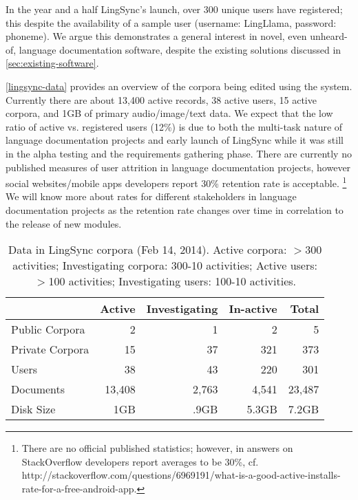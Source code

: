 \documentclass[11pt]{article}
\begin{document}
In the year and a half LingSync's launch, over 300 unique users have
registered; this despite the availability of a sample user (username:
LingLlama, password: phoneme). We argue this demonstrates a general interest in
novel, even unheard-of, language documentation software, despite the existing
solutions discussed in \autoref{sec:existing-software}.

\autoref{lingsync-data} provides an overview of the corpora being edited using
the system. Currently there are about 13,400 active records, 38 active users,
15 active corpora, and 1GB of primary audio/image/text data. We expect that the
low ratio of active vs. registered users (12\%) is due to both the multi-task
nature of language documentation projects and early launch of LingSync while it
was still in the alpha testing and the requirements gathering phase.  There are currently no published measures of user
attrition in language documentation projects, however social websites/mobile
apps  developers report 30\% retention rate is acceptable.%
\footnote{There are no official published statistics; however, in answers on
    StackOverflow developers report averages to be 30\%, cf.
http://stackoverflow.com/questions/6969191/what-is-a-good-active-installs-rate-for-a-free-android-app.}
We will
know more about rates for different stakeholders in language documentation projects as the retention rate changes over time  in correlation to the
release of new modules.

\begin{table}[h]
\begin{center}
\scriptsize
\begin{tabular}{lrrrr}
      \toprule
                     ~ &  Active & Investigating & In-active & Total\\
      \midrule
      Public Corpora  &       2 &   1 &   2 & 5 \\ 
      Private Corpora &      15 &  37 & 321 & 373\\ 
      Users           &      38 &  43 & 220 & 301 \\
      Documents & 13,408 & 2,763 & 4,541 &23,487\\
      Disk Size & 1GB & .9GB & 5.3GB& 7.2GB\\
      
      \bottomrule

\end{tabular}
\caption{Data in LingSync corpora (Feb 14, 2014). Active corpora: $>$300
activities; Investigating corpora: 300-10 activities; Active users: $>$100
activities; Investigating users: 100-10 activities.}
\label{lingsync-data}
 \end{center}
 \normalsize
\end{table}
\end{document}
